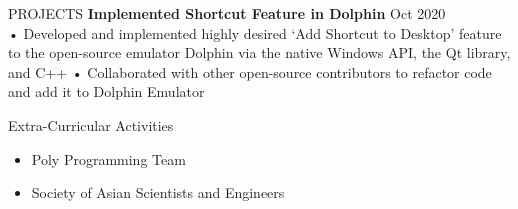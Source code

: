 \documentclass{resume} %
\begin{document}
\begin{rSection}{PROJECTS}
\textbf{\bf Implemented Shortcut Feature in Dolphin } \hfill Oct 2020  \\%
• Developed and implemented highly desired ‘Add Shortcut to Desktop’ feature to the open-source emulator Dolphin via the native Windows API, the Qt library, and C++
\newline
• Collaborated with other open-source contributors to refactor code and add it to Dolphin Emulator


\end{rSection} 

\begin{rSection}{Extra-Curricular Activities} 
\begin{itemize} %
    \item 	Poly Programming Team
    \item   Society of Asian Scientists and Engineers

\end{itemize}


\end{rSection}
\end{document}

